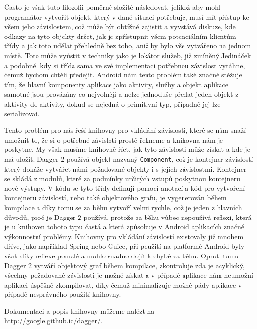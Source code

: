 \documentclass{article}
\begin{document}
Často je však tuto filozofii poměrně složité následovat, jelikož aby mohl programátor vytvořit objekt, který
v dané situaci potřebuje, musí mít přístup ke všem jeho závislostem, což může být obtížné zajistit
a vyvstává diskuze, kde odkazy na tyto objekty držet, jak je zpřístupnit všem potenciálním klientům třídy
a jak toto udělat přehledně bez toho, aniž by bylo vše vytvářeno na jednom místě. Toto může vyústit v techniky
jako je lokátor služeb, již zmíněný Jedináček a podobné, kdy si třída sama ve své implementaci potřebnou
závislost vytáhne, čemuž bychom chtěli předejít.
Android nám tento problém také značně stěžuje tím, že hlavní komponenty aplikace jako aktivity, služby a objekt
aplikace samotné jsou provázány co nejvolněji a nelze jednoduše předat jeden objekt z aktivity do aktivity,
dokud se nejedná o primitivní typ, případně jej lze serializovat.

Tento problém pro nás řeší knihovny pro vkládání závislostí, které se nám snaží umožnit to, že si o potřebné
závisloti prostě řekneme a knihovna nám je poskytne. My však musíme knihovně říct, jak tyto závislosti může
získat a kde je má uložit. Dagger 2 používá objekt nazvaný \texttt{Component}, což je kontejner závislostí
který dokáže vytvářet námi požadované objekty i s jejich závislostmi. Kontejner se skládá z modulů, které
za podmínky určitých vstupů poskytnou kontejneru nové výstupy. V kódu se tyto třídy definují pomocí anotací
a kód pro vytvoření kontejneru závislostí, nebo také objektového grafu, je vygenerován během kompilace
a díky tomu se za běhu vytvoří velmi rychle, což je jeden z hlavních důvodů, proč je Dagger 2 používá,
protože za běhu vůbec nepoužívá reflexi, která je u knihoven tohoto typu častá a která způsobuje v Android
aplikacích značné výkonnostní problémy. Knihovny pro vkládání závislostí existovaly již mnohem dříve,
jako například Spring nebo Guice, při použití na platformě Android byly však díky reflexe pomalé a mohlo snadno
dojít k chybě za běhu. Oproti tomu Dagger 2 vytváří objektový graf během kompilace, zkontroluje zda je acyklický,
všechny požadované závislosti je možné získat a v případě aplikace nám neumožní aplikaci úspěšně zkompilovat,
díky čemuž minimalizuje možné pády aplikace v případě nesprávného použití knihovny.

Dokumentaci a popis knihovny můžeme nalézt na \url{http://google.github.io/dagger/}.
\end{document}
